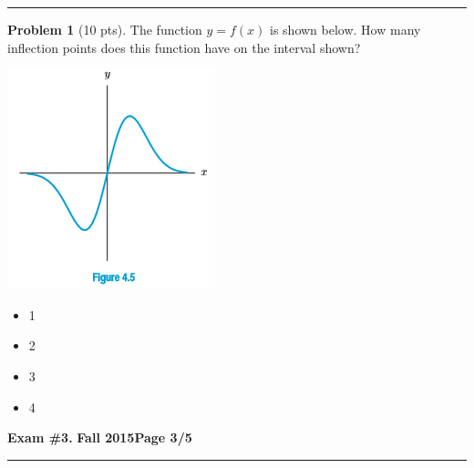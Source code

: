 \documentclass[12pt]{article}
\makeatletter
\theoremstyle{definition}
\newtheorem{problem}{Problem}
\newcommand*{\radiobutton}{%
  \@ifstar{\@radiobutton0}{\@radiobutton1}%
}
\newcommand*{\@radiobutton}[1]{%
  \begin{tikzpicture}
    \pgfmathsetlengthmacro\radius{height("X")/2}
    \draw[radius=\radius] circle;
    \ifcase#1 \fill[radius=.6*\radius] circle;\fi
  \end{tikzpicture}%
}
\makeatother
\begin{document}
\vspace{3cm}
\hrule
\begin{problem}[10 pts]
The function $y=f(x)$ is shown below.  How many inflection points does this function have on the interval shown?
\begin{center}
\includegraphics{graph1.png}
\end{center}
\begin{itemize}
\item[\radiobutton] 1
\item[\radiobutton] 2
\item[\radiobutton] 3
\item[\radiobutton] 4
\end{itemize}
\end{problem}
\newpage

\hfill{\large\bf Exam \#3.}\hfill{\large\bf
  Fall 2015}\hfill{\large\bf Page 3/5}\hrule
\end{document}
